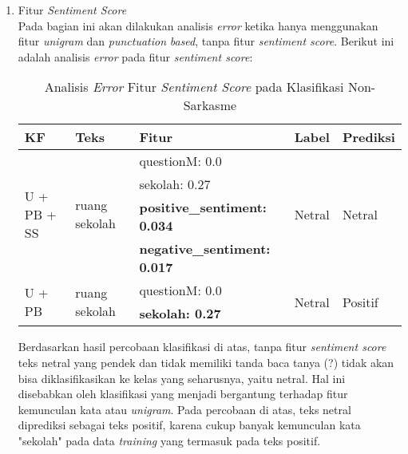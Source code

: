 \begin{enumerate}[leftmargin=*,nolistsep]
	\item Fitur \textit{Sentiment Score}\\
	Pada bagian ini akan dilakukan analisis \textit{error} ketika hanya menggunakan fitur \textit{unigram }dan \textit{punctuation} \textit{based}, tanpa fitur \textit{sentiment score}. Berikut ini adalah analisis \textit{error} pada fitur \textit{sentiment score}:
	
	\begin{table}[H]
		\caption{Analisis \textit{Error} Fitur \textit{Sentiment Score} pada Klasifikasi Non-Sarkasme}
		\centering
	\small
	\begin{adjustbox}{width=1\textwidth}
	\begin{tabular}{|p{1.7cm}|p{3.15cm}|p{4.3cm}|p{1cm}|p{1.3cm}|}
		\hline
		\textbf{KF} & \textbf{Teks} & \textbf{Fitur} & \textbf{Label} & \textbf{Prediksi} \\
		\hline
		\multirow{4}{*}{\parbox{1.7cm}{U + PB + SS}}& \multirow{4}{*}{\parbox{3.15cm}{ruang sekolah}} & questionM: 0.0 
		& \multirow{4}{*}{\parbox{1cm}{Netral}} & \multirow{4}{*}{\parbox{1.3cm}{Netral}} \\
		\cline{3-3}
		& & sekolah: 0.27 & & \\
		\cline{3-3}
		& &  \textbf{positive\_sentiment: 0.034} & & \\
		\cline{3-3}
		& & \textbf{negative\_sentiment: 0.017} & & \\
		\hline
		\multirow{2}{*}{\parbox{1.7cm}{U + PB}} & \multirow{2}{*}{\parbox{3.15cm}{ ruang sekolah}} & questionM: 0.0 & \multirow{2}{*}{\parbox{1cm}{Netral}} & \multirow{2}{*}{\parbox{1.3cm}{Positif}} \\
		\cline{3-3}
		& & \textbf{sekolah: 0.27}& & \\
		\hline
	\end{tabular}
	\end{adjustbox}
	\end{table}
	Berdasarkan hasil percobaan klasifikasi di atas, tanpa fitur \textit{sentiment score} teks netral yang pendek dan tidak memiliki tanda baca tanya (?) tidak akan bisa diklasifikasikan ke kelas yang seharusnya, yaitu netral. Hal ini disebabkan oleh klasifikasi yang menjadi bergantung terhadap fitur kemunculan kata atau \textit{unigram}. Pada percobaan di atas, teks netral diprediksi sebagai teks positif, karena cukup banyak kemunculan kata "sekolah" pada data \textit{training} 
	yang termasuk pada teks positif.
	

\end{enumerate}
